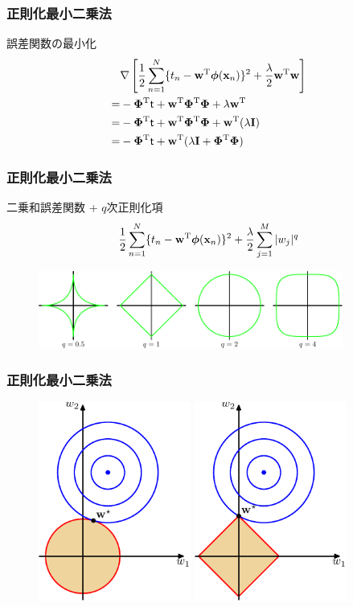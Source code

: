 \documentclass[12pt]{beamer}
\begin{document}
\begin{frame}
  \frametitle{正則化最小二乗法}
  誤差関数の最小化
  \begin{align*}
    & \nabla \left[ \frac{1}{2} \sum_{n=1}^N \{ t_n - {\rm \bf w}^{\rm T} \boldsymbol \phi({\rm \bf x}_n) \}^2
      + \frac{\lambda}{2} {\rm \bf w}^{\rm T} {\rm \bf w} \right] \\
    = & - {\rm \bf \Phi}^{\rm T} {\bf \mathsf{t}} + {\rm \bf w}^{\rm T} {\rm \bf \Phi}^{\rm T} {\rm \bf \Phi} + \lambda {\rm \bf w}^{\rm T} \\
    = & - {\rm \bf \Phi}^{\rm T} {\bf \mathsf{t}} + {\rm \bf w}^{\rm T} {\rm \bf \Phi}^{\rm T} {\rm \bf \Phi} + {\rm \bf w}^{\rm T} (\lambda {\rm \bf I}) \\
    = & - {\rm \bf \Phi}^{\rm T} {\bf \mathsf{t}} + {\rm \bf w}^{\rm T} ( \lambda {\rm \bf I} + {\rm \bf \Phi}^{\rm T} {\rm \bf \Phi} ) \\
  \end{align*}
\end{frame}

\begin{frame}
  \frametitle{正則化最小二乗法}
  二乗和誤差関数 + \(q\)次正則化項
  \begin{align*}
    \frac{1}{2} \sum_{n=1}^N \{ t_n - {\rm \bf w}^{\rm T} \boldsymbol \phi({\rm \bf x}_n) \}^2 + \frac{\lambda}{2} \sum_{j=1}^M |w_j|^q
  \end{align*}
  \begin{figure}
    \centering
    \includegraphics[width=10cm]{Figure3.3.pdf}
  \end{figure}
\end{frame}

\begin{frame}
  \frametitle{正則化最小二乗法}
  \begin{figure}
    \centering
    \includegraphics[width=5cm]{Figure3.4a.pdf}
    \includegraphics[width=5cm]{Figure3.4b.pdf}
  \end{figure}
\end{frame}
\end{document}
